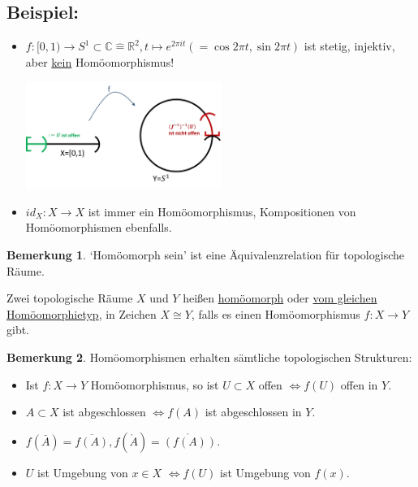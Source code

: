 \documentclass[a4paper,11pt,notitlepage]{report}
\theoremstyle{definition}
\newtheorem{remark}{Bemerkung}[chapter]
\newcommand{\R}{{\ensuremath{\mathbb{R}}}}
\newcommand{\C}{{\ensuremath{\mathbb{C}}}}
\newenvironment{bsp}[1]
{
\setlength{\fboxsep}{10pt}
\subsection*{Beispiel: #1}
\begin{upshape}
}
{
\end{upshape}
}
\newenvironment{definition}[1]{
	\begin{definitions}
	\marginnote{\emph{#1}}
}{\end{definitions}}
\begin{document}
\begin{bsp}{}
	\begin{itemize}
		\item $f \colon [0,1) \rightarrow S^1 \subset \C \hat{=} \R^2, t \mapsto e^{2 \pi i t} (= \cos {2 \pi t}, \sin {2 \pi t})$ ist stetig, injektiv, aber \underline{kein} Homöomorphismus!
		\begin{center}
		\includegraphics[width=0.5\textwidth]{images/0_1_nach_S1_f-1_nicht_stetig.png}
		\end{center}
		\item $id_X \colon X \rightarrow X$ ist immer ein Homöomorphismus, Kompositionen von Homöomorphismen ebenfalls.
	\end{itemize}
\end{bsp}

\begin{remark}
	`Homöomorph sein' ist eine Äquivalenzrelation für topologische Räume.
\end{remark}

\begin{definition}{homöomorph}
	Zwei topologische Räume $X$ und $Y$ heißen \underline{homöomorph} oder \underline{vom gleichen Homöomorphietyp}, in Zeichen $X \cong Y$, falls es einen Homöomorphismus $f \colon X \rightarrow Y$ gibt.
\end{definition}

\begin{remark}
	Homöomorphismen erhalten sämtliche topologischen Strukturen:
	\begin{itemize}
		\item Ist $f \colon X \rightarrow Y$ Homöomorphismus, so ist $U \subset X$ offen $\Leftrightarrow f(U)$ offen in $Y$.
		\item $A \subset X$ ist abgeschlossen $\Leftrightarrow f(A)$ ist abgeschlossen in $Y$.
		\item $f(\bar{A}) = \overline{f(A)}, f(\mathring A) = \mathring{\left(f(A)\right)}$.
		\item $U$ ist Umgebung von $x \in X$ $\Leftrightarrow f(U)$ ist Umgebung von $f(x)$.
	\end{itemize}
\end{remark}
\end{document}
